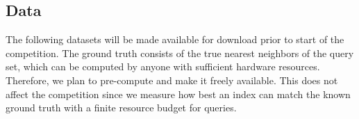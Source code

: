 \begin{comment}
\subsection{Novelty}
At a high-level, the Big-ANNS competition is closely related to the
benchmarking efforts on the website \url{ann-benchmarks.com}~\cite{Benchmark} in that it allows comparisons of
recall vs latency properties of algorithms without a memory
budget. However, the proposed competition is novel in several
regards. It is the first evaluation on datasets spanning
\emph{billions of vectors} from real-world scenarios, with existing
benchmarks topping at around million vectors. Secondly, and equally
importantly, it is the first comprehensive evaluation of the trade-off
between quality of the ANNS system and its \emph{hardware cost}. The
existing benchmark site allows any algorithm which can build and serve
the index in a certain fixed SKU\footnote{Stock Keeping Units. Used here in reference to cloud virtual machines of a certain configuration}, and does not differentiate between
algorithms which use the entire resource and those which use a tenth
of the allotted SKU.

Our competition also be the first effort to bring together most
leading efforts for this problem from academia and industry which we
hope will advance state-of-the-art significantly. Another novelty is
that we also \emph{intend to actively welcome solutions} and proposals
from more \emph{financially-constrained participants}, by providing
compute credits for the required SKUs, provided the solutions meet
certain qualifying criteria on medium-scale datasets. Lastly, as
mentioned before, another novelty of this effort is to collect
large-scale real-world datasets from various industrial labs where
they play a crucial role in various application domains.

\end{comment}


\subsection{Data}
The following datasets will be made available for download prior to
start of the competition. The ground truth consists of the true
nearest neighbors of the query set, which can be computed by anyone
with sufficient hardware resources. Therefore, we plan to pre-compute and make it
freely available.  This does not affect the competition since we
measure how best an index can match the known ground truth with a
finite resource budget for queries.

